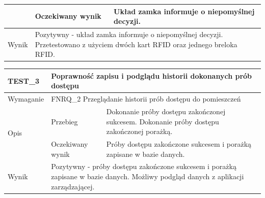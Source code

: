 \begin{table}[h!]
\begin{subtable}[c]{\textwidth}
\begin{tabular}{p{2cm}|p{}|p{}}
                                          & Oczekiwany wynik   & Układ zamka informuje o niepomyślnej decyzji.                                                 \\ \hline
                    Wynik                 & \multicolumn{2}{p{12cm}}{Pozytywny - układ zamka informuje o niepomyślnej decyzji. Przetestowano z użyciem dwóch kart RFID oraz jednego breloka RFID.}
                    \end{tabular}%
                \label{tbl:test2}
                \vspace{10mm}
            \end{subtable}
        \quad%
            \begin{subtable}[c]{\textwidth}
                \centering
                    \begin{tabular}{p{2cm}|p{}|p{}}
                    TEST\_3               & \multicolumn{2}{l}{\textbf{Poprawność zapisu i podglądu historii dokonanych prób dostępu}}                                                            \\ \hline
                    Wymaganie             & \multicolumn{2}{p{12cm}}{FNRQ\_2 Przeglądanie historii prób dostępu do pomieszczeń}                                                                                    \\ \hline
                    \multirow{2}{*}{Opis} & Przebieg           & Dokonanie próby dostępu zakończonej sukcesem. Dokonanie próby dostępu zakończonej porażką.                                    \\ \cline{2-3}
                                         & Oczekiwany wynik   & Próby dostępu zakończone sukcesem i porażką zapisane w bazie danych.                                                 \\ \hline
                    Wynik                 & \multicolumn{2}{p{12cm}}{Pozytywny - próby dostępu zakończone sukcesem i porażką zapisane w bazie danych. Możliwy podgląd danych z aplikacji zarządzającej.} \\
                    \end{tabular}%
                \label{tbl:test3}
                \vspace{10mm}
            \end{subtable}
            \label{tbl:tests}
        \end{table}

        \pagebreak

